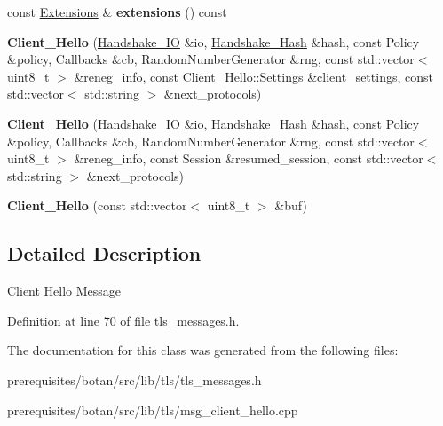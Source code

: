\begin{DoxyCompactItemize}
\mbox{\label{class_botan_1_1_t_l_s_1_1_client___hello_a3d3139562dc4d0d9b9e017f2da87da9a}} 
const \mbox{\hyperlink{class_botan_1_1_t_l_s_1_1_extensions}{Extensions}} \& {\bfseries extensions} () const
\item 
\mbox{\label{class_botan_1_1_t_l_s_1_1_client___hello_a23b5ddd3f8874d4f21735caf1b8a74bf}} 
{\bfseries Client\+\_\+\+Hello} (\mbox{\hyperlink{class_botan_1_1_t_l_s_1_1_handshake___i_o}{Handshake\+\_\+\+IO}} \&io, \mbox{\hyperlink{class_botan_1_1_t_l_s_1_1_handshake___hash}{Handshake\+\_\+\+Hash}} \&hash, const Policy \&policy, Callbacks \&cb, Random\+Number\+Generator \&rng, const std\+::vector$<$ uint8\+\_\+t $>$ \&reneg\+\_\+info, const \mbox{\hyperlink{class_botan_1_1_t_l_s_1_1_client___hello_1_1_settings}{Client\+\_\+\+Hello\+::\+Settings}} \&client\+\_\+settings, const std\+::vector$<$ std\+::string $>$ \&next\+\_\+protocols)
\item 
\mbox{\label{class_botan_1_1_t_l_s_1_1_client___hello_afac7f76bc1d5da48d139db2ccdbc01fa}} 
{\bfseries Client\+\_\+\+Hello} (\mbox{\hyperlink{class_botan_1_1_t_l_s_1_1_handshake___i_o}{Handshake\+\_\+\+IO}} \&io, \mbox{\hyperlink{class_botan_1_1_t_l_s_1_1_handshake___hash}{Handshake\+\_\+\+Hash}} \&hash, const Policy \&policy, Callbacks \&cb, Random\+Number\+Generator \&rng, const std\+::vector$<$ uint8\+\_\+t $>$ \&reneg\+\_\+info, const Session \&resumed\+\_\+session, const std\+::vector$<$ std\+::string $>$ \&next\+\_\+protocols)
\item 
\mbox{\label{class_botan_1_1_t_l_s_1_1_client___hello_a6344772d277964e5e413cd3bd9fa6dda}} 
{\bfseries Client\+\_\+\+Hello} (const std\+::vector$<$ uint8\+\_\+t $>$ \&buf)
\end{DoxyCompactItemize}


\subsection{Detailed Description}
Client Hello Message 

Definition at line 70 of file tls\+\_\+messages.\+h.



The documentation for this class was generated from the following files\+:\begin{DoxyCompactItemize}
\item 
prerequisites/botan/src/lib/tls/tls\+\_\+messages.\+h\item 
prerequisites/botan/src/lib/tls/msg\+\_\+client\+\_\+hello.\+cpp\end{DoxyCompactItemize}
